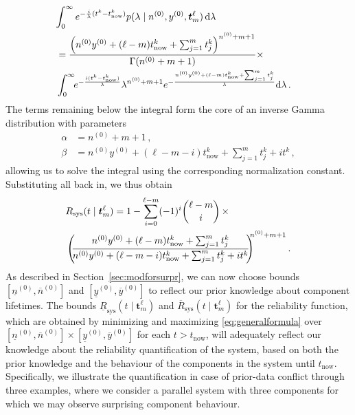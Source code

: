 \documentclass[12pt,a4paper,twocolumn,fleqn]{narms}
\newcommand{\dd}{\,\mathrm{d}}
\renewcommand{\vec}[1]{{\bm#1}}
\newcommand{\uz}{^{(0)}} %
\newcommand{\ul}[1]{\underline{#1}}
\newcommand{\ol}[1]{\overline{#1}}
\newcommand{\lRsys}{\ul{R}_\text{sys}}
\newcommand{\uRsys}{\ol{R}_\text{sys}}
\def\yz{y\uz}
\def\yzl{\ul{y}\uz}
\def\yzu{\ol{y}\uz}
\def\nz{n\uz}
\def\nzl{\ul{n}\uz}
\def\nzu{\ol{n}\uz}
\begin{document}
\begin{align}
\lefteqn{%
    \int_0^\infty e^{-\frac{i}{\lambda} (t^k - t_\text{now}^k)} %
    p(\lambda \mid \nz, \yz, \vec{t}_m^\ell) \dd\lambda } \\
 &= \frac{\left(\nz \yz + (\ell-m) t_\text{now}^k + \sum_{j=1}^{m} t_j^k \right)^{\nz + m + 1}}{\Gamma(\nz + m + 1)}\times \\
 &  \int_0^\infty\!\! e^{-\frac{i(t^k - t_\text{now}^k)}{\lambda}} \lambda^{\nz + m + 1}
    e^{-\frac{\nz \yz + (\ell-m) t_\text{now}^k + \sum_{j=1}^m t_j^k}{\lambda}}\! \dd\lambda\,.
\end{align}
The terms remaining below the integral form the core of an inverse Gamma distribution
with parameters
\begin{align}
\alpha &= \nz + m + 1\,,\\
\beta  &= \nz \yz + (\ell - m - i) t_\text{now}^k + \sum_{j=1}^{m} t_j^k + i t^k\,,
\end{align}
allowing us to solve the integral using the corresponding normalization constant.
%
Substituting all back in, we thus obtain
\begin{align}
\label{eq:generalformula}
\lefteqn{%
R_\text{sys}(t \mid \vec{t}_m^\ell)
  = 1 - \sum_{i=0}^{\ell-m} (-1)^i {\ell-m \choose i} \, \times } & \\
 & %
   \left(\!\! \frac{\nz \yz + (\ell-m)   t_\text{now}^k + \sum_{j=1}^{m} t_j^k}%
                   {\nz \yz + (\ell-m-i) t_\text{now}^k + \sum_{j=1}^{m} t_j^k + i t^k} \!\!\right)^{\!\!\!\nz + m + 1}.
\end{align}
%
As described in Section~\ref{sec:modforsurpr},
we can now choose bounds $[\nzl, \nzu]$ and $[\yzl, \yzu]$
to reflect our prior knowledge about component lifetimes.
The bounds $\lRsys(t \mid \vec{t}_m^\ell)$ and $\uRsys(t \mid \vec{t}_m^\ell)$ for the reliability function,
which are obtained by minimizing and maximizing \eqref{eq:generalformula}
over $[\nzl, \nzu] \times [\yzl, \yzu]$ for each $t > t_\text{now}$,
will adequately reflect our knowledge about the reliability quantification of the system,
based on both the prior knowledge and the behaviour of the components in the system until $t_\text{now}$.
Specifically, we illustrate the quantification in case of prior-data conflict through three examples,
where we consider a parallel system with three components
for which we may observe surprising component behaviour.
\end{document}
